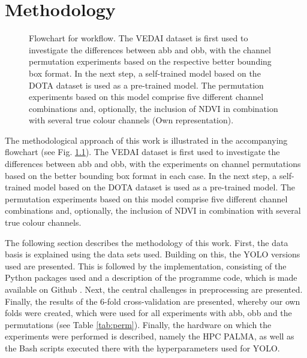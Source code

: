 \chapter{Methodology}
\label{ch:methodology}
\begin{figure}[htbp]
    \centering
    
    \caption[Flowchart for workflow]{Flowchart for workflow. The VEDAI dataset is first used to investigate the differences between \acrshort{abb} and \acrshort{obb}, with the channel permutation experiments based on the respective better bounding box format. In the next step, a self-trained model based on the DOTA dataset is used as a pre-trained model. The permutation experiments based on this model comprise five different channel combinations and, optionally, the inclusion of NDVI in combination with several true colour channels (Own representation).}
    \label{fig:Flowchart}
\end{figure}

The methodological approach of this work is illustrated in the accompanying flowchart (see Fig. \ref{fig:Flowchart}). The \acrshort{VEDAI} dataset is first used to investigate the differences between \acrshort{abb} and \acrshort{obb}, with the experiments on channel permutations based on the better bounding box format in each case. In the next step, a self-trained model based on the DOTA dataset is used as a pre-trained model. The permutation experiments based on this model comprise five different channel combinations and, optionally, the inclusion of NDVI in combination with several true colour channels.

The following section describes the methodology of this work. First, the data basis is explained using the data sets used. Building on this, the \acrshort{YOLO} versions used are presented. This is followed by the implementation, consisting of the Python packages used and a description of the programme code, which is made available on Github \cite{Github_timo}. Next, the central challenges in preprocessing are presented. Finally, the results of the 6-fold cross-validation are presented, whereby our own folds were created, which were used for all experiments with \acrshort{abb}, \acrshort{obb} and the permutations (see Table \ref{tab:perm}). Finally, the hardware on which the experiments were performed is described, namely the \acrlong{HPC} \acrshort{PALMA}, as well as the Bash scripts executed there with the hyperparameters used for \acrshort{YOLO}. 



